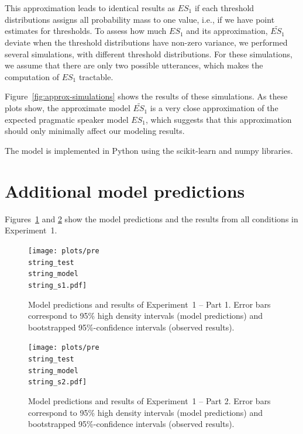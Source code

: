 \documentclass[man, floatsintext]{apa6}
\begin{document}
This approximation leads to identical results as $ES_1$ if each threshold distributions assigns all probability mass to one value, 
i.e., if we have point estimates for thresholds. To assess how much $ES_1$ and its approximation, $\widetilde{ES_1}$ deviate when 
the threshold distributions have non-zero variance, we performed several simulations, with different threshold distributions. For these
simulations, we assume that there are only two possible utterances, which makes the computation of $ES_1$ tractable.

Figure~\ref{fig:approx-simulations} shows the results of these simulations. As these plots show, the approximate model $\widetilde{ES_1}$ is a very close approximation of the expected
pragmatic speaker model $ES_1$, which suggests that this approximation should only minimally affect our modeling results. 

The model is implemented in Python using the scikit-learn \parencite{Scikit2011} and numpy \parencite{vanderWalt2011} libraries.

\section{Additional model predictions}
\setcounter{section}{4}

Figures~\ref{fig:norming-results-model-1} and \ref{fig:norming-results-model-2} show the model predictions and the results from all conditions in Experiment~1. 

\begin{figure}[h!]
\texttt{[image: plots/pre\\string\_test\\string\_model\\string\_s1.pdf]}
\caption{Model predictions and results of Experiment~1 -- Part 1. Error bars correspond to 95\% high density intervals (model predictions) and bootstrapped 95\%-confidence intervals (observed results). \label{fig:norming-results-model-1}}

\end{figure}

\begin{figure}[h!]
\texttt{[image: plots/pre\\string\_test\\string\_model\\string\_s2.pdf]}
\caption{Model predictions and results of Experiment~1  -- Part 2. Error bars correspond to 95\% high density intervals (model predictions) and bootstrapped 95\%-confidence intervals (observed results). \label{fig:norming-results-model-2}}

\end{figure}
\end{document}
